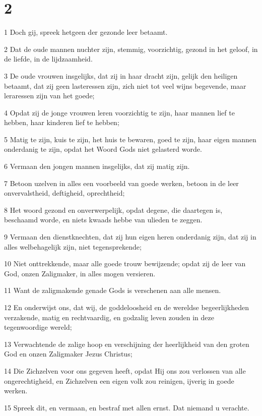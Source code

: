 \chapter{2}

\par 1 Doch gij, spreek hetgeen der gezonde leer betaamt.
\par 2 Dat de oude mannen nuchter zijn, stemmig, voorzichtig, gezond in het geloof, in de liefde, in de lijdzaamheid.
\par 3 De oude vrouwen insgelijks, dat zij in haar dracht zijn, gelijk den heiligen betaamt, dat zij geen lasteressen zijn, zich niet tot veel wijns begevende, maar leraressen zijn van het goede;
\par 4 Opdat zij de jonge vrouwen leren voorzichtig te zijn, haar mannen lief te hebben, haar kinderen lief te hebben;
\par 5 Matig te zijn, kuis te zijn, het huis te bewaren, goed te zijn, haar eigen mannen onderdanig te zijn, opdat het Woord Gods niet gelasterd worde.
\par 6 Vermaan den jongen mannen insgelijks, dat zij matig zijn.
\par 7 Betoon uzelven in alles een voorbeeld van goede werken, betoon in de leer onvervalstheid, deftigheid, oprechtheid;
\par 8 Het woord gezond en onverwerpelijk, opdat degene, die daartegen is, beschaamd worde, en niets kwaads hebbe van ulieden te zeggen.
\par 9 Vermaan den dienstknechten, dat zij hun eigen heren onderdanig zijn, dat zij in alles welbehagelijk zijn, niet tegensprekende;
\par 10 Niet onttrekkende, maar alle goede trouw bewijzende; opdat zij de leer van God, onzen Zaligmaker, in alles mogen versieren.
\par 11 Want de zaligmakende genade Gods is verschenen aan alle mensen.
\par 12 En onderwijst ons, dat wij, de goddeloosheid en de wereldse begeerlijkheden verzakende, matig en rechtvaardig, en godzalig leven zouden in deze tegenwoordige wereld;
\par 13 Verwachtende de zalige hoop en verschijning der heerlijkheid van den groten God en onzen Zaligmaker Jezus Christus;
\par 14 Die Zichzelven voor ons gegeven heeft, opdat Hij ons zou verlossen van alle ongerechtigheid, en Zichzelven een eigen volk zou reinigen, ijverig in goede werken.
\par 15 Spreek dit, en vermaan, en bestraf met allen ernst. Dat niemand u verachte.

